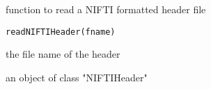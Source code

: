 \begin{Description}\relax
function to read a NIFTI formatted header file
\end{Description}
\begin{Usage}
\begin{verbatim}
readNIFTIHeader(fname)
\end{verbatim}
\end{Usage}
\begin{Arguments}
\begin{ldescription}
\item[\code{fname}] the file name of the header 
\end{ldescription}
\end{Arguments}
\begin{Value}
an object of class "NIFTIHeader"
\end{Value}

